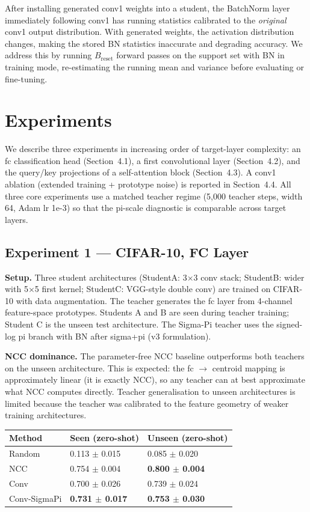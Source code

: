 \documentclass{article}
\begin{document}
After installing generated conv1 weights into a student, the BatchNorm layer immediately following conv1 has running statistics calibrated to the \emph{original} conv1 output distribution. With generated weights, the activation distribution changes, making the stored BN statistics inaccurate and degrading accuracy. We address this by running $B_{\mathrm{reset}}$ forward passes on the support set with BN in training mode, re-estimating the running mean and variance before evaluating or fine-tuning.

\section{Experiments}\label{experiments}

We describe three experiments in increasing order of target-layer complexity: an fc classification head (Section~4.1), a first convolutional layer (Section~4.2), and the query/key projections of a self-attention block (Section~4.3). A conv1 ablation (extended training + prototype noise) is reported in Section~4.4. All three core experiments use a matched teacher regime (5,000 teacher steps, width 64, Adam lr 1e-3) so that the pi-scale diagnostic is comparable across target layers.

\subsection{Experiment 1 --- CIFAR-10, FC Layer}\label{experiment-1-cifar-10-fc-layer}

\textbf{Setup.} Three student architectures (StudentA: 3$\times$3 conv stack; StudentB: wider with 5$\times$5 first kernel; StudentC: VGG-style double conv) are trained on CIFAR-10 with data augmentation. The teacher generates the fc layer from 4-channel feature-space prototypes. Students A and B are seen during teacher training; Student C is the unseen test architecture. The Sigma-Pi teacher uses the signed-log pi branch with BN after sigma+pi (v3 formulation).

\textbf{NCC dominance.} The parameter-free NCC baseline outperforms both teachers on the unseen architecture. This is expected: the fc $\to$ centroid mapping is approximately linear (it is exactly NCC), so any teacher can at best approximate what NCC computes directly. Teacher generalisation to unseen architectures is limited because the teacher was calibrated to the feature geometry of weaker training architectures.

\begin{longtable}[]{@{}lll@{}}
\toprule\noalign{}
Method & Seen (zero-shot) & Unseen (zero-shot) \\
\midrule\noalign{}
\endhead
\bottomrule\noalign{}
\endlastfoot
Random & 0.113 $\pm$ 0.015 & 0.085 $\pm$ 0.020 \\
NCC & 0.754 $\pm$ 0.004 & \textbf{0.800 $\pm$ 0.004} \\
Conv & 0.700 $\pm$ 0.026 & 0.739 $\pm$ 0.024 \\
Conv-SigmaPi & \textbf{0.731 $\pm$ 0.017} & \textbf{0.753 $\pm$ 0.030} \\
\end{longtable}
\end{document}
